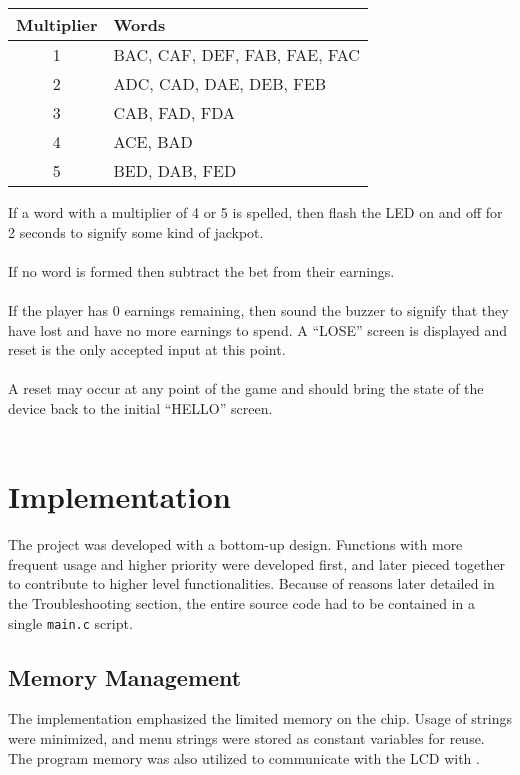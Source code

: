 \documentclass[usletter, 12pt]{article}
\begin{document}
    \begin{table}[h]
        \centering
        \begin{tabular}{@{\extracolsep{\fill}} cl}

        \textbf{Multiplier} & \textbf{Words} \\
        \hline
        1 & BAC, CAF, DEF, FAB, FAE, FAC  \\
        2 & ADC, CAD, DAE, DEB, FEB \\
        3 & CAB, FAD, FDA \\
        4 & ACE, BAD \\
        5 & BED, DAB, FED \\
        \end{tabular}
    \end{table}

    \noindent If a word with a multiplier of 4 or 5 is spelled, then flash the
    LED on and off for 2 seconds to signify some kind of jackpot. \\~\\
    \noindent If no word is formed then subtract the bet from their earnings.
    \\~\\
    \noindent If the player has 0 earnings remaining, then sound the buzzer to
    signify that they have lost and have no more earnings to spend. A “LOSE”
    screen is displayed and reset is the only accepted input at this point.
    \\~\\
    \noindent A reset may occur at any point of the game and should bring the
    state of the device back to the initial “HELLO” screen. \\~\\
    \section{Implementation} The project was developed with a bottom-up
    design. Functions with more frequent usage and higher priority were
    developed first, and later pieced together to contribute to higher level
    functionalities. Because of reasons later detailed in the Troubleshooting
    section, the entire source code had to be contained in a single
    \texttt{main.c} script.

    \subsection{Memory Management} The implementation emphasized the limited
    memory on the chip. Usage of strings were minimized, and menu strings were
    stored as constant  variables for reuse. The program
    memory was also utilized to communicate with the LCD with
    .
\end{document}

